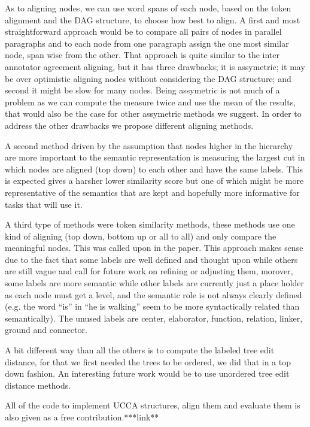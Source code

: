 \documentclass[english]{article}
\begin{document}
As to aligning nodes, we can use word spans of each node, based on
the token alignment and the DAG structure, to choose how best to align.
A first and most straightforward approach would be to compare all
pairs of nodes in parallel paragraphs and to each node from one paragraph
assign the one most similar node, span wise from the other. That approach
is quite similar to the inter annotator agreement aligning, but it
has three drawbacks; it is assymetric; it may be over optimistic aligning
nodes without considering the DAG structure; and second it might be
slow for many nodes. Being assymetric is not much of a problem as
we can compute the measure twice and use the mean of the results,
that would also be the case for other assymetric methods we suggest.
In order to address the other drawbacks we propose different aligning
methods.

A second method driven by the assumption that nodes higher in the
hierarchy are more important to the semantic representation is measuring
the largest cut in which nodes are aligned (top down) to each other
and have the same labels. This is expected gives a harsher lower similarity
score but one of which might be more representative of the semantics
that are kept and hopefully more informative for tasks that will use
it.

A third type of methods were token similarity methods, these methods
use one kind of aligning (top down, bottom up or all to all) and only
compare the meaningful nodes. This was called upon in the \cite{sulem2015conceptual}
paper. This approach makes sense due to the fact that some labels
are well defined and thought upon while others are still vague and
call for future work on refining or adjusting them, morover, some
labels are more semantic while other labels are currently just a place
holder as each node must get a level, and the semantic role is not
always clearly defined (e.g. the word ``is'' in ``he is walking''
seem to be more syntactically related than semantically). The unused
labels are center, elaborator, function, relation, linker, ground
and connector.

A bit different way than all the others is to compute the labeled
tree edit distance\cite{zhang1989simple}, for that we first needed
the trees to be ordered, we did that in a top down fashion. An interesting
future work would be to use unordered tree edit distance methods\cite{zhang1992editing}.

All of the code to implement UCCA structures, align them and evaluate
them is also given as a free contribution.{*}{*}{*}link{*}{*}
\end{document}
